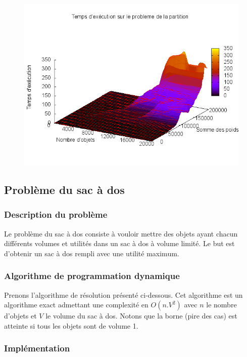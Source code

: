 \begin{figure}[H]
	\includegraphics[width=\linewidth]{../pratique/prog_dynamique_dev/res/partition.png}
\end{figure}


\subsection{Problème du sac à dos}

\subsubsection{Description du problème}
Le problème du sac à dos consiste à vouloir mettre des objets ayant chacun différents volumes et utilités dans un sac à dos à volume limité. Le but est d'obtenir un sac à dos rempli avec une utilité maximum.

\subsubsection{Algorithme de programmation dynamique}
Prenons l'algorithme de résolution présenté ci-dessous. Cet algorithme est un algorithme exact admettant une complexité en $O(n.V^2)$ avec $n$ le nombre d'objets et $V$ le volume du sac à dos. Notons que la borne (pire des cas) est atteinte si tous les objets sont de volume 1.


\subsubsection{Implémentation}\label{bag_impl}

